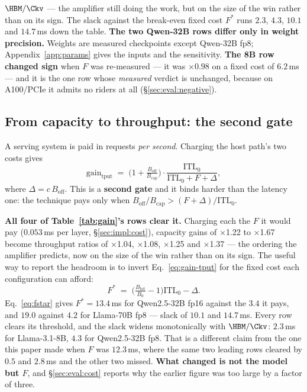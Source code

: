 \begin{table}[t]
{{$\HBM/\Ckv$} --- the amplifier still doing the work, but on the size of the win
rather than on its sign. The slack against the break-even fixed cost $F^{*}$ runs
$2.3$, $4.3$, $10.1$ and $14.7$\,ms down the table.
\textbf{The two Qwen-32B rows differ only in weight precision.} Weights are
measured checkpoints except Qwen-32B fp8; Appendix~\ref{app:params} gives the
inputs and the sensitivity.
\textbf{The 8B row changed sign} when $F$ was re-measured --- it was
$\times 0.98$ on a fixed cost of $6.2$\,ms --- and it is the one row whose
\emph{measured} verdict is unchanged, because on A100/PCIe it admits no riders at
all (\S\ref{sec:eval:negative}).}
\label{tab:gain}
\end{table}

\subsection{From capacity to throughput: the second gate}
\label{sec:model:omits}

A serving system is paid in requests \emph{per second}. Charging the host path's
two costs gives
%
\begin{equation}
\label{eq:gain-tput}
\text{gain}_{\text{tput}} \;=\;
  \Big(1 + \tfrac{B_{\mathrm{off}}}{B_{\mathrm{cap}}}\Big)
  \cdot \frac{\mathrm{ITL}_0}{\mathrm{ITL}_0 + F + \Delta},
\end{equation}
%
where $\Delta = c\,B_{\mathrm{off}}$. This is a \textbf{second gate} and it binds
harder than the latency one: the technique pays only when
$B_{\mathrm{off}}/B_{\mathrm{cap}} > (F + \Delta)/\mathrm{ITL}_0$.

\textbf{All four of Table~\ref{tab:gain}'s rows clear it.} Charging each the $F$ it
would pay ($0.053$\,ms per layer, \S\ref{sec:impl:cost}), capacity gains of
$\times$1.22 to $\times$1.67 become throughput ratios of $\times$1.04,
$\times$1.08, $\times$1.25 and $\times$1.37 --- the ordering the amplifier
predicts, now on the size of the win rather than on its sign. The useful way to
report the headroom is to invert Eq.~\ref{eq:gain-tput} for the fixed cost each
configuration can afford:
%
\begin{equation}
\label{eq:fstar}
F^{*} \;=\; \Big(\tfrac{B_{\mathrm{tot}}}{B_0} - 1\Big)\mathrm{ITL}_0 - \Delta.
\end{equation}
%
Eq.~\ref{eq:fstar} gives $F^{*} = 13.4$\,ms for Qwen2.5-32B fp16 against the
$3.4$ it pays, and $19.0$ against $4.2$ for Llama-70B fp8 --- slack of $10.1$ and
$14.7$\,ms. Every row clears its threshold, and the slack widens monotonically
with $\HBM/\Ckv$: $2.3$\,ms for Llama-3.1-8B, $4.3$ for Qwen2.5-32B fp8. That is a
different claim from the one this paper made when $F$ was $12.3$\,ms, where the
same two leading rows cleared by $0.5$ and $2.8$\,ms and the other two missed.
\textbf{What changed is not the model but $F$}, and \S\ref{sec:eval:cost} reports
why the earlier figure was too large by a factor of three.

